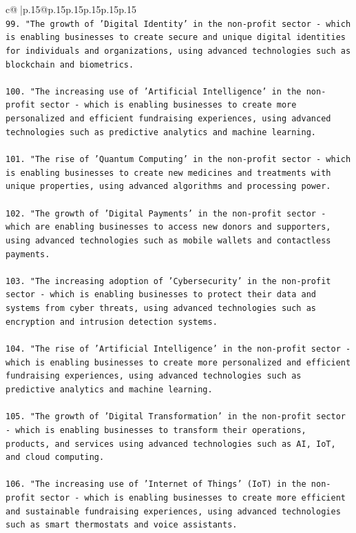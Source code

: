 \documentclass{article}
\begin{document}
{\begin{supertabular}{c@{$\;$}|p{.15\linewidth}@{}p{.15\linewidth}p{.15\linewidth}p{.15\linewidth}p{.15\linewidth}p{.15\linewidth}}
{{{\\ 
\texttt{99. "The growth of 'Digital Identity' in the non{-}profit sector {-} which is enabling businesses to create secure and unique digital identities for individuals and organizations, using advanced technologies such as blockchain and biometrics.} \\
\\ 
\texttt{100. "The increasing use of 'Artificial Intelligence' in the non{-}profit sector {-} which is enabling businesses to create more personalized and efficient fundraising experiences, using advanced technologies such as predictive analytics and machine learning.} \\
\\ 
\texttt{101. "The rise of 'Quantum Computing' in the non{-}profit sector {-} which is enabling businesses to create new medicines and treatments with unique properties, using advanced algorithms and processing power.} \\
\\ 
\texttt{102. "The growth of 'Digital Payments' in the non{-}profit sector {-} which are enabling businesses to access new donors and supporters, using advanced technologies such as mobile wallets and contactless payments.} \\
\\ 
\texttt{103. "The increasing adoption of 'Cybersecurity' in the non{-}profit sector {-} which is enabling businesses to protect their data and systems from cyber threats, using advanced technologies such as encryption and intrusion detection systems.} \\
\\ 
\texttt{104. "The rise of 'Artificial Intelligence' in the non{-}profit sector {-} which is enabling businesses to create more personalized and efficient fundraising experiences, using advanced technologies such as predictive analytics and machine learning.} \\
\\ 
\texttt{105. "The growth of 'Digital Transformation' in the non{-}profit sector {-} which is enabling businesses to transform their operations, products, and services using advanced technologies such as AI, IoT, and cloud computing.} \\
\\ 
\texttt{106. "The increasing use of 'Internet of Things' (IoT) in the non{-}profit sector {-} which is enabling businesses to create more efficient and sustainable fundraising experiences, using advanced technologies such as smart thermostats and voice assistants.} \\
}}}
\end{supertabular}}
\end{document}
